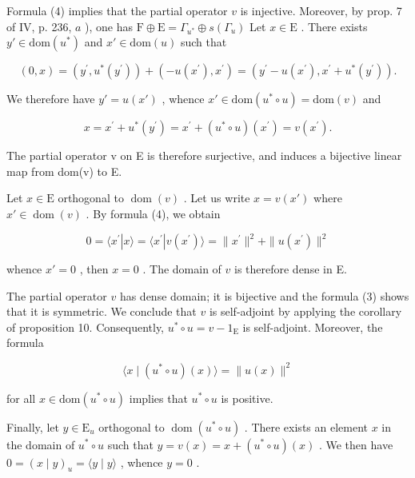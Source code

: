 Formula (4) implies that the partial operator \(v\) is injective. Moreover, by prop. 7 of IV, p. 236, \(a\) ), one has \(\mathrm{F} \oplus \mathrm{E} = \Gamma_{u^*} \oplus s(\Gamma_u)\) Let \(x \in \mathrm{E}\) . There exists \(y' \in \mathrm{dom}(u^*)\) and \(x' \in \mathrm{dom}(u)\) such that

\[
(0, x) = (y ^ {\prime}, u ^ {*} (y ^ {\prime})) + (- u (x ^ {\prime}), x ^ {\prime}) = (y ^ {\prime} - u (x ^ {\prime}), x ^ {\prime} + u ^ {*} (y ^ {\prime})).
\]

We therefore have \(y' = u(x')\) , whence \(x' \in \text{dom}(u^* \circ u) = \text{dom}(v)\) and

\[
x = x ^ {\prime} + u ^ {*} (y ^ {\prime}) = x ^ {\prime} + (u ^ {*} \circ u) (x ^ {\prime}) = v (x ^ {\prime}).
\]

The partial operator v on E is therefore surjective, and induces a bijective linear map from dom(v) to E.

Let \(x \in \mathrm{E}\) orthogonal to \(\operatorname{dom}(v)\) . Let us write \(x = v(x')\) where \(x' \in \operatorname{dom}(v)\) . By formula (4), we obtain

\[
0 = \langle x ^ {\prime} | x \rangle = \langle x ^ {\prime} | v (x ^ {\prime}) \rangle = \| x ^ {\prime} \| ^ {2} + \| u (x ^ {\prime}) \| ^ {2}
\]

whence \(x' = 0\) , then \(x = 0\) . The domain of \(v\) is therefore dense in E.

The partial operator \(v\) has dense domain; it is bijective and the formula (3) shows that it is symmetric. We conclude that \(v\) is self-adjoint by applying the corollary of proposition 10. Consequently, \(u^{*} \circ u = v - 1_{\mathrm{E}}\) is self-adjoint. Moreover, the formula

\[
\langle x \mid (u ^ {*} \circ u) (x) \rangle = \| u (x) \| ^ {2}
\]

for all \(x \in \text{dom}(u^{*} \circ u)\) implies that \(u^{*} \circ u\) is positive.

Finally, let \(y \in \mathrm{E}_u\) orthogonal to \(\operatorname{dom}(u^* \circ u)\) . There exists an element \(x\) in the domain of \(u^* \circ u\) such that \(y = v(x) = x + (u^* \circ u)(x)\) . We then have \(0 = (x \mid y)_u = \langle y \mid y \rangle\) , whence \(y = 0\) .

